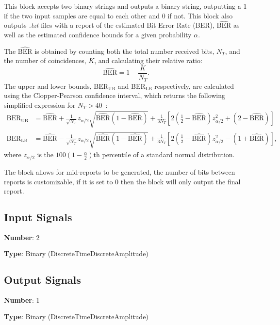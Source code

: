 This block accepts two binary strings and outputs a binary string, outputting a 1 if the two input samples are equal to each other and 0 if not. This block also outputs \textit{.txt} files with a report of the estimated Bit Error Rate (BER), $\widehat{\text{BER}}$ as well as the estimated confidence bounds for a given probability $\alpha$.
\par
The $\widehat{\text{BER}}$ is obtained by counting both the total number received bits, $N_T$, and the number of coincidences, $K$, and calculating their relative ratio:
\begin{equation}
\widehat{\text{BER}}=1-\frac{K}{N_T}.
\end{equation}
The upper and lower bounds, $\text{BER}_\text{UB}$ and $\text{BER}_\text{LB}$ respectively, are calculated using the Clopper-Pearson confidence interval, which returns the following simplified expression for $N_T>40$~\cite{almeida2016continuous}:
\begin{align}
\text{BER}_\text{UB}&=\widehat{\text{BER}}+\frac{1}{\sqrt{N_T}}z_{\alpha/2}\sqrt{\widehat{\text{BER}}(1-\widehat{\text{BER}})}+\frac{1}{3N_T}\left[2\left(\frac{1}{2}-\widehat{\text{BER}}\right)z_{\alpha/2}^2+(2-\widehat{\text{BER}})\right]\\
\text{BER}_\text{LB}&=\widehat{\text{BER}}-\frac{1}{\sqrt{N_T}}z_{\alpha/2}\sqrt{\widehat{\text{BER}}(1-\widehat{\text{BER}})}+\frac{1}{3N_T}\left[2\left(\frac{1}{2}-\widehat{\text{BER}}\right)z_{\alpha/2}^2-(1+\widehat{\text{BER}})\right],
\end{align}
where $z_{\alpha/2}$ is the $100\left(1-\frac{\alpha}{2}\right)$th percentile of a standard normal distribution.

The block allows for mid-reports to be generated, the number of bits between reports is customizable, if it is set to 0 then the block will only output the final report.

\subsection*{Input Signals}

\textbf{Number}: 2

\textbf{Type}: Binary (DiscreteTimeDiscreteAmplitude)

\subsection*{Output Signals}

\textbf{Number}: 1

\textbf{Type}: Binary (DiscreteTimeDiscreteAmplitude)


 
